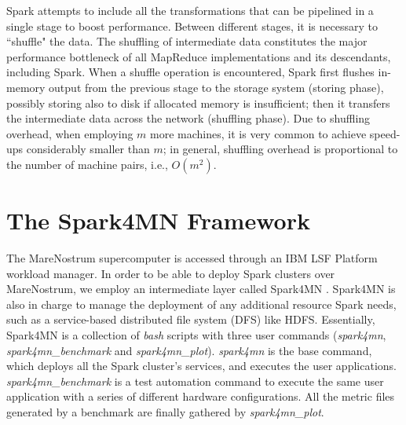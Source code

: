 \documentclass[journal]{IEEEtran}
\begin{document}
Spark attempts to include all the transformations that can be pipelined in a single stage to boost performance. Between different stages, it is necessary to ``shuffle" the data. The shuffling of intermediate data constitutes the major performance bottleneck of all MapReduce implementations and its descendants, including Spark. When a shuffle operation is encountered, Spark first flushes in-memory output from the previous stage to the storage system (storing phase), possibly storing also to disk if allocated memory is insufficient; then it transfers the intermediate data across the network (shuffling phase). Due to shuffling overhead, when employing $m$ more machines, it is very common to achieve speed-ups considerably smaller than $m$; in general, shuffling overhead is proportional to the number of machine pairs, i.e., $O(m^2)$.

\section{The Spark4MN Framework}
\label{sec:spark4mn}
The MareNostrum supercomputer is accessed through an IBM LSF Platform workload manager. In order to be able to deploy Spark clusters over MareNostrum, we employ an intermediate layer called Spark4MN \cite{conf/bigdataconf/TousGournaris15}. Spark4MN is also in charge to manage the deployment of any additional resource Spark needs, such as a service-based distributed file system (DFS) like HDFS.
Essentially, Spark4MN is a collection of {\it bash} scripts with three user commands ({\it spark4mn}, {\it spark4mn\_benchmark} and {\it spark4mn\_plot}). {\it spark4mn} is the base command, which deploys all the Spark
cluster's services, and executes the user applications. {\it spark4mn\_benchmark} is a test automation command to execute the same user application with a series of different hardware configurations. All the metric files generated by a benchmark are finally gathered by {\it spark4mn\_plot}.

\end{document}
